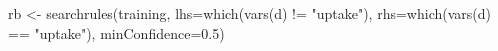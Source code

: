 \begin{Schunk}
% --begin: "pbld4"
\begin{Sinput}
 rb <- searchrules(training,
                   lhs=which(vars(d) != "uptake"),
                   rhs=which(vars(d) == "uptake"),
                   minConfidence=0.5)
\end{Sinput}
%
% --end: "pbld4"
\end{Schunk}
